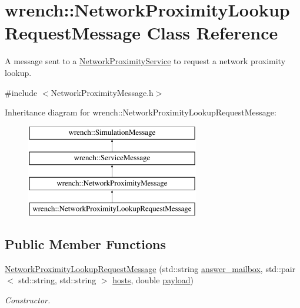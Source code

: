 \hypertarget{classwrench_1_1_network_proximity_lookup_request_message}{}\section{wrench\+:\+:Network\+Proximity\+Lookup\+Request\+Message Class Reference}
\label{classwrench_1_1_network_proximity_lookup_request_message}


A message sent to a \hyperlink{classwrench_1_1_network_proximity_service}{Network\+Proximity\+Service} to request a network proximity lookup.  




{\ttfamily \#include $<$Network\+Proximity\+Message.\+h$>$}

Inheritance diagram for wrench\+:\+:Network\+Proximity\+Lookup\+Request\+Message\+:\begin{figure}[H]
\begin{center}
\leavevmode
\includegraphics[height=4.000000cm]{classwrench_1_1_network_proximity_lookup_request_message}
\end{center}
\end{figure}
\subsection*{Public Member Functions}
\begin{DoxyCompactItemize}
\item 
\hyperlink{classwrench_1_1_network_proximity_lookup_request_message_a04e078d44b0e8bd4cd7f59916baaca82}{Network\+Proximity\+Lookup\+Request\+Message} (std\+::string \hyperlink{classwrench_1_1_network_proximity_lookup_request_message_aba90de7e971b92a2c26f45f2f4792705}{answer\+\_\+mailbox}, std\+::pair$<$ std\+::string, std\+::string $>$ \hyperlink{classwrench_1_1_network_proximity_lookup_request_message_af220802502401663de010c2ca46fb88d}{hosts}, double \hyperlink{classwrench_1_1_simulation_message_a914f2732713f7c02898e66f05a7cb8a1}{payload})
\begin{DoxyCompactList}\small\item\em Constructor. \end{DoxyCompactList}\end{DoxyCompactItemize}
